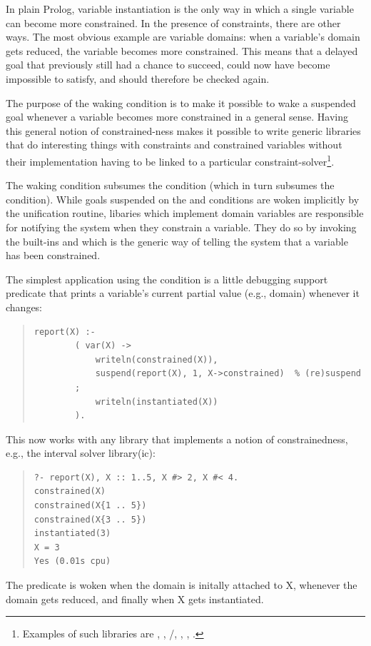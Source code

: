 {In plain Prolog, variable instantiation is the only way in which a single
variable can become more constrained.  In the presence of constraints,
there are other ways. The most obvious example are variable domains:
when a variable's domain gets reduced, the variable becomes more
constrained. This means that a delayed goal that previously still had
a chance to succeed, could now have become impossible to satisfy,
and should therefore be checked again.

The purpose of the  waking condition is to make it
possible to wake a suspended goal whenever a variable becomes more
constrained in a general sense. Having this general notion
of constrained-ness makes it possible to write generic libraries
that do interesting things with constraints and constrained variables
without their implementation having to be linked to a particular
constraint-solver\footnote{%
  Examples of such libraries are ,
  , /, ,
  , .}.

The  waking condition subsumes the 
condition
(which in turn subsumes the  condition).
While goals suspended on the  and  conditions
are woken implicitly by the unification routine, libaries which implement
domain variables are responsible for notifying the system when they
constrain a variable. They do so by invoking the built-ins
and 
which is the generic way of telling the system that a variable has been
constrained.

The simplest application using the  condition is a little
debugging support predicate that prints a variable's current partial value
(e.g., domain) whenever it changes:
\begin{quote}
\begin{verbatim}
report(X) :-
        ( var(X) ->
            writeln(constrained(X)),
            suspend(report(X), 1, X->constrained)  % (re)suspend
        ;
            writeln(instantiated(X))
        ).
\end{verbatim}
\end{quote}
This now works with any library that implements a notion of constrainedness,
e.g., the interval solver library(ic):
\begin{quote}
\begin{verbatim}
?- report(X), X :: 1..5, X #> 2, X #< 4.
constrained(X)
constrained(X{1 .. 5})
constrained(X{3 .. 5})
instantiated(3)
X = 3
Yes (0.01s cpu)
\end{verbatim}
\end{quote}
The  predicate is woken when the domain is initally attached
to X,
whenever the domain gets reduced, and finally when X gets instantiated.



}
